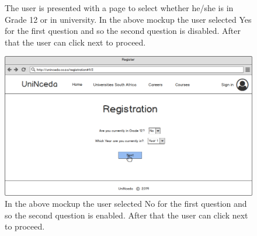 \documentclass[a4paper, 12pt]{article}
\begin{document}
\renewcommand{\figurename}{Step}

\setcounter{figure}{0}

\begin{figure}[H]
\centering
\caption{The user is presented with a page to select whether he/she is in Grade 12 or in university. In the above mockup the user selected Yes for the first question and so the second question is disabled. After that the user can click next to proceed.}
\label{Registration(1)IfYes}

\vspace{1cm}
\setcounter{figure}{0}

\includegraphics[scale=0.45]{Registration(1)IfNo}
\caption{ In the above mockup the user selected No for the first question and so the second question is enabled. After that the user can click next to proceed.}
\label{Registration(1)IfNo}
\end{figure}
\end{document}

